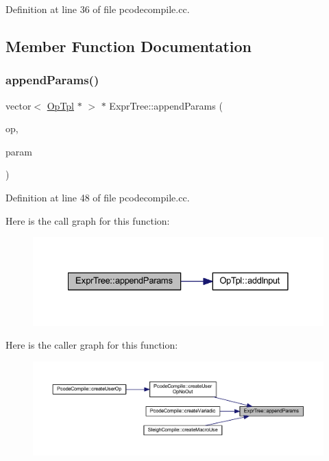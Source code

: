 Definition at line 36 of file pcodecompile.\+cc.



\subsection{Member Function Documentation}
\mbox{\label{class_expr_tree_a0c63f868c69166c17663f82f6af8ebbf}} 
\subsubsection{\texorpdfstring{appendParams()}{appendParams()}}
{\footnotesize\ttfamily vector$<$ \mbox{\hyperlink{class_op_tpl}{Op\+Tpl}} $\ast$ $>$ $\ast$ Expr\+Tree\+::append\+Params (\begin{DoxyParamCaption}\item[{\mbox{\hyperlink{class_op_tpl}{Op\+Tpl}} $\ast$}]{op,  }\item[{vector$<$ \mbox{\hyperlink{class_expr_tree}{Expr\+Tree}} $\ast$ $>$ $\ast$}]{param }\end{DoxyParamCaption})\hspace{0.3cm}{\ttfamily [static]}}



Definition at line 48 of file pcodecompile.\+cc.

Here is the call graph for this function\+:
\nopagebreak
\begin{figure}[H]
\begin{center}
\leavevmode
\includegraphics[width=328pt]{class_expr_tree_a0c63f868c69166c17663f82f6af8ebbf_cgraph}
\end{center}
\end{figure}
Here is the caller graph for this function\+:
\nopagebreak
\begin{figure}[H]
\begin{center}
\leavevmode
\includegraphics[width=350pt]{class_expr_tree_a0c63f868c69166c17663f82f6af8ebbf_icgraph}
\end{center}
\end{figure}
\mbox{\label{class_expr_tree_aa996c79d60e836c6f9062b26cc5f6c69}} 
